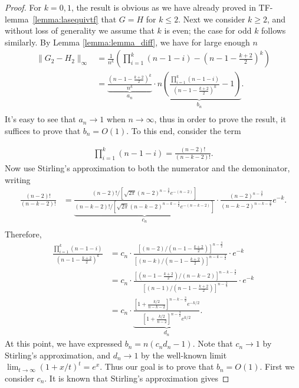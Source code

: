 \documentclass[a4paper]{article}
\begin{document}
\begin{proof}
For $k = 0, 1$, the result is obvious as we have already proved in TF-lemma~\ref{lemma:lasequivtf} that $G = H$ for $k\leq 2$. Next we consider $k\geq 2$, and without loss of generality we assume that $k$ is even; the case for odd $k$ follows similarly. By Lemma \ref{lemma:lemma_diff}, we have for large enough $n$
\begin{align*}
\|G_2-H_2\|_\infty &= \frac{1}{n^k}(\prod_{i=1}^k(n-1-i) - (n-1-\frac{k+2}{2})^k)\\
&= \underbrace{\frac{(n-1-\frac{k+2}{2})^k}{n^k}}_\text{$a_n$} \cdot \underbrace{n(\frac{\prod_{i=1}^k(n-1-i)}{(n-1-\frac{k+2}{2})^k} - 1)}_\text{$b_n$}.\\
\end{align*}
It's easy to see that $a_n\rightarrow 1$ when $n\rightarrow \infty$, thus in order to prove the result, it suffices to prove that $b_n = O(1)$. To this end, consider the term

\begin{align*}
\prod_{i=1}^k (n-1-i) = \frac{(n-2)!}{(n-k-2)!}.
\end{align*}
Now use Stirling's approximation to both the numerator and the demoninator, writing
\begin{align*}
\frac{(n-2)!}{(n-k-2)!} &= \underbrace{\frac{(n-2)!/[\sqrt{2\pi}(n-2)^{n-\frac{3}{2}}e^{-(n-2)}]}{(n-k-2)!/[\sqrt{2\pi}(n-k-2)^{n-k-\frac{3}{2}}e^{-(n-k-2)}]}}_\text{$c_n$}\cdot\frac{(n-2)^{n-\frac{3}{2}}}{(n-k-2)^{n-k-\frac{3}{2}}}e^{-k}.\\
\end{align*}
Therefore,
\begin{align*}
\frac{\prod_{i=1}^k(n-1-i)}{(n-1-\frac{k+2}{2})^k} &= c_n \cdot \frac{[(n-2)/(n-1-\frac{k+2}{2})]^{n-\frac{3}{2}}}{[(n-k)/(n-1-\frac{k+2}{2})]^{n-k-\frac{3}{2}}}\cdot e^{-k}\\
&= c_n \cdot \frac{[(n-1-\frac{k+2}{2})/(n-k-2)]^{n-k-\frac{3}{2}}}{[(n-1)/(n-1-\frac{k+2}{2})]^{n-\frac{3}{2}}}\cdot e^{-k}\\
&= c_n \cdot \underbrace{\frac{[1+\frac{k/2}{n-k-2}]^{n-k-\frac{3}{2}}e^{-k/2}}{[1+\frac{k/2}{n-2}]^{n-\frac{3}{2}}e^{k/2}}}_\text{$d_n$}.
\end{align*}
At this point, we have expressed $b_n = n(c_nd_n -1)$. Note that $c_n\rightarrow 1$ by Stirling's approximation, and $d_n\rightarrow 1$ by the well-known limit $\lim_{t\rightarrow \infty}(1+x/t)^t = e^x$. Thus our goal is to prove that $b_n = O(1)$. First we consider $c_n$. It is known that Stirling's approximation \cite{nemes2010coefficients} gives


\end{proof}
\end{document}
